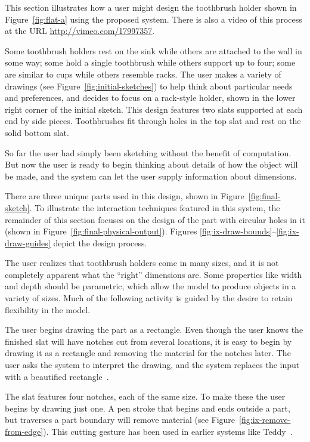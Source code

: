 \documentclass[12pt]{article}
\begin{document}
This section illustrates how a user might design the toothbrush holder
shown in Figure~\ref{fig:flat-a} using the proposed system. There is
also a video of this process at the URL
\href{http://vimeo.com/17997357}{http://vimeo.com/17997357}.

Some toothbrush holders rest on the sink while others are attached to
the wall in some way; some hold a single toothbrush while others
support up to four; some are similar to cups while others resemble
racks. The user makes a variety of drawings (see
Figure~\ref{fig:initial-sketches}) to help think about particular
needs and preferences, and decides to focus on a rack-style holder,
shown in the lower right corner of the initial sketch. This design
features two slats supported at each end by side pieces. Toothbrushes
fit through holes in the top slat and rest on the solid bottom slat.

So far the user had simply been sketching without the benefit of
computation. But now the user is ready to begin thinking about details
of how the object will be made, and the system can let the user supply
information about dimensions.

There are three unique parts used in this design, shown in
Figure~\ref{fig:final-sketch}. To illustrate the interaction
techniques featured in this system, the remainder of this section
focuses on the design of the part with circular holes in it (shown in
Figure~\ref{fig:final-physical-output}). Figures
\ref{fig:ix-draw-bounds}--\ref{fig:ix-draw-guides} depict the design
process.

The user realizes that toothbrush holders come in many sizes, and it
is not completely apparent what the ``right'' dimensions are. Some
properties like width and depth should be parametric, which allow the
model to produce objects in a variety of sizes. Much of the following
activity is guided by the desire to retain flexibility in the model.

The user begins drawing the part as a rectangle. Even though the user
knows the finished slat will have notches cut from several locations,
it is easy to begin by drawing it as a rectangle and removing the
material for the notches later. The user asks the system to interpret
the drawing, and the system replaces the input with a beautified
rectangle~\cite{pavlidis-beautifier}.

The slat features four notches, each of the same size. To make these
the user begins by drawing just one. A pen stroke that begins and ends
outside a part, but traverses a part boundary will remove material
(see Figure~\ref{fig:ix-remove-from-edge}). This cutting gesture has
been used in earlier systems like Teddy~\cite{igarashi-teddy}.
\end{document}
